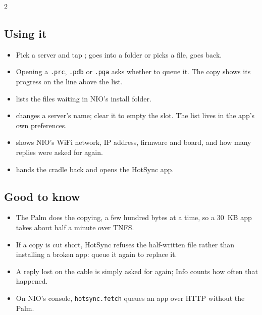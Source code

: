 \begin{multicols}{2}
\subsection*{Using it}
\begin{itemize}
  \item Pick a server and tap ;  goes into a folder or
    picks a file,  goes back.
  \item Opening a \texttt{.prc}, \texttt{.pdb} or \texttt{.pqa} asks whether
    to queue it. The copy shows its progress on the line above the list.
  \item {} lists the files waiting in NIO's install folder.
  \item {} changes a server's name; clear it to empty the slot. The
    list lives in the app's own preferences.
  \item {} shows NIO's WiFi network, IP address, firmware and board,
    and how many replies were asked for again.
  \item {} hands the cradle back and opens the HotSync app.
\end{itemize}

\subsection*{Good to know}
\begin{itemize}
  \item The Palm does the copying, a few hundred bytes at a time, so a 30~KB
    app takes about half a minute over TNFS.
  \item If a copy is cut short, HotSync refuses the half-written file rather
    than installing a broken app: queue it again to replace it.
  \item A reply lost on the cable is simply asked for again; Info counts how
    often that happened.
  \item On NIO's console, \texttt{hotsync.fetch} queues an app over HTTP
    without the Palm.
\end{itemize}
\end{multicols}

\begin{center}
\hfill
{}\hfill
{}
\end{center}

